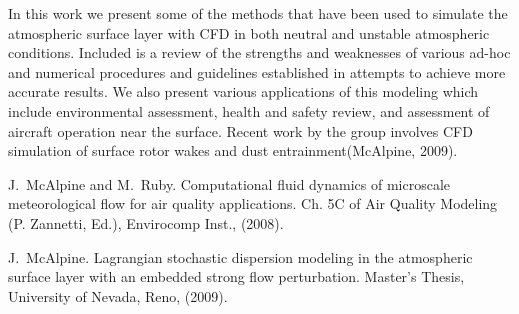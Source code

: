 In this work we present some of the methods that have been used to simulate the atmospheric surface layer with CFD in both neutral and unstable atmospheric conditions. Included is a review of the strengths and weaknesses of various ad-hoc and numerical procedures and guidelines established in attempts to achieve more accurate results. We also present various applications of this modeling which include environmental assessment, health and safety review, and assessment of aircraft 
operation near the surface. Recent work by the group involves CFD simulation of surface rotor wakes and dust entrainment(McAlpine, 2009).


\begin{thebibliography}{10}
{\sc J.~McAlpine and M.~Ruby}. {Computational fluid dynamics of microscale meteorological flow for air quality applications}. Ch. 5C of Air Quality Modeling (P. Zannetti, Ed.), Envirocomp Inst., (2008).

{\sc J.~McAlpine}. {Lagrangian stochastic dispersion modeling in the atmospheric surface layer with an embedded strong flow perturbation}. Master's Thesis,  University of Nevada, Reno, (2009).
\end{thebibliography}